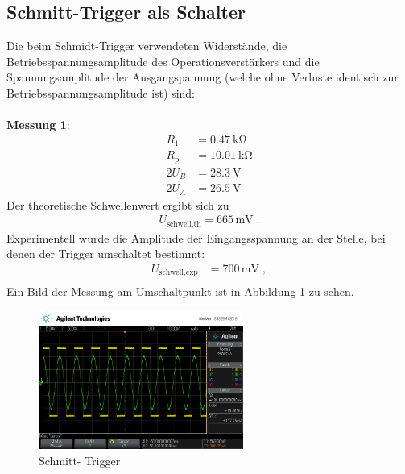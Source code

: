 \documentclass{scrartcl}
\begin{document}
\subsection{Schmitt-Trigger als Schalter}
 Die beim Schmidt-Trigger verwendeten Widerstände, die Betriebsspannungsamplitude des Operationsverstärkers und die Spannungsamplitude der Ausgangspannung (welche ohne Verluste identisch zur Betriebsspannungsamplitude ist) sind:\\
 \\ \textbf{Messung 1}:
 \begin{align}
 R_1 &= \SI{0,47}{\kilo \ohm}\\
 R_\text{p} &= \SI{10,01}{\kilo \ohm}\\
 2U_B&=\SI{28,3}{\volt}\\
 2U_A&=\SI{26,5}{\volt}
 \end{align}
 Der theoretische Schwellenwert ergibt sich zu
 \begin{align}
 U_\text{schwell,th} = 665\,\text{mV}\;.
 \end{align}
 Experimentell wurde die Amplitude der Eingangsspannung an der Stelle, bei denen der Trigger umschaltet bestimmt:
 \begin{align}
 U_\text{schwell,exp} &= 700\,\text{mV}\;,\\
 \end{align}
 Ein Bild der Messung am Umschaltpunkt ist in Abbildung \ref{trigger1} zu sehen.
  \begin{figure}[!h]
\centering
\includegraphics[width=0.6\textwidth]{aufnahmen_neu/scope_195.png}
\caption{Schmitt- Trigger}
\label{trigger1}
\end{figure}
\end{document}
